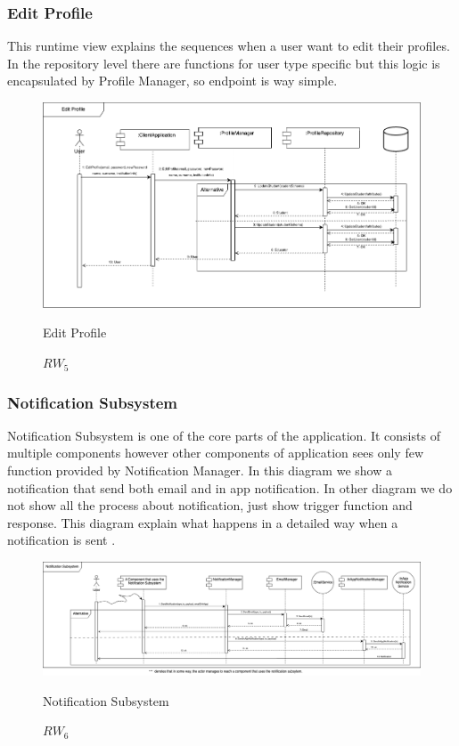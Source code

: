 \subsubsection{Edit Profile}
This runtime view explains the sequences when a user want to edit their profiles. In the repository level there are functions for user type specific but this logic is encapsulated by Profile Manager, so endpoint is way simple.
\begin{figure}[H]
    \centering
    \includegraphics[width=\linewidth]{Images/runtime/edit_profile.drawio.png}
    \caption{$RW_{5}$} Edit Profile
\end{figure}


\subsubsection{Notification Subsystem}
Notification Subsystem is one of the core parts of the application. It consists of multiple components however other components of application sees only few function provided by Notification Manager. In this diagram we show a notification that send both email and in app notification. In other diagram we do not show all the process about notification, just show trigger function and response. This diagram explain what happens in a detailed way when a notification is sent .
\begin{figure}[H]
    \centering
    \includegraphics[width=\linewidth]{Images/runtime/notification_runtime.drawio.png}
    \caption{$RW_{6}$} Notification Subsystem
\end{figure}

